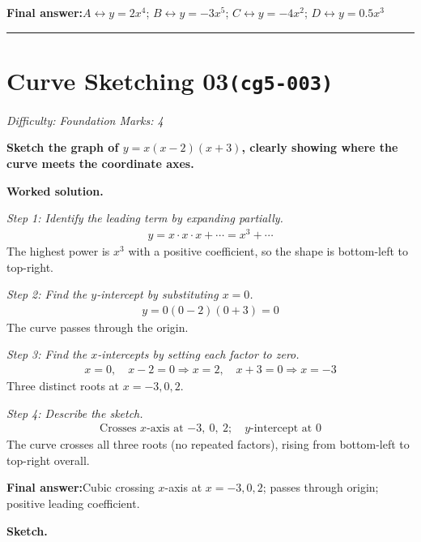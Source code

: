 \documentclass[11pt]{article}
\newcommand{\question}[1]{\par\medskip\noindent\textbf{#1}\par}
\begin{document}
\begin{answerbox}
\textbf{Final answer:}\quad \(\displaystyle A \leftrightarrow y = 2x^4\); \(\displaystyle B \leftrightarrow y = -3x^5\); \(\displaystyle C \leftrightarrow y = -4x^2\); \(\displaystyle D \leftrightarrow y = 0.5x^3\)
\end{answerbox}
\medskip\hrule

\section*{Curve Sketching 03\quad\small\texttt{(cg5-003)}}
\textit{Difficulty: Foundation \quad\textbar\quad Marks: 4}

\question{Sketch the graph of \( y = x(x - 2)(x + 3) \), clearly showing where the curve meets the coordinate axes.}

\textbf{Worked solution.}

\textit{Step 1: Identify the leading term by expanding partially.}
\[\begin{gathered}
y = x \cdot x \cdot x + \cdots = x^3 + \cdots
\end{gathered}\]
The highest power is \( x^3 \) with a positive coefficient, so the shape is bottom-left to top-right.

\textit{Step 2: Find the \( y \)-intercept by substituting \( x = 0 \).}
\[\begin{gathered}
y = 0(0-2)(0+3) = 0
\end{gathered}\]
The curve passes through the origin.

\textit{Step 3: Find the \( x \)-intercepts by setting each factor to zero.}
\[\begin{gathered}
x = 0, \quad x - 2 = 0 \Rightarrow x = 2, \quad x + 3 = 0 \Rightarrow x = -3
\end{gathered}\]
Three distinct roots at \( x = -3, 0, 2 \).

\textit{Step 4: Describe the sketch.}
\[\begin{gathered}
\text{Crosses } x\text{-axis at } {-3,\ 0,\ 2};\quad y\text{-intercept at } 0
\end{gathered}\]
The curve crosses all three roots (no repeated factors), rising from bottom-left to top-right overall.

\begin{answerbox}
\textbf{Final answer:}\quad Cubic crossing \(\displaystyle x\)-axis at \(\displaystyle x = -3, 0, 2\); passes through origin; positive leading coefficient.
\end{answerbox}
\textbf{Sketch.}
\end{document}
